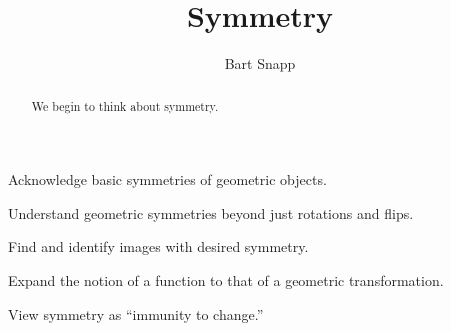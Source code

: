 \documentclass[noauthor,nooutcomes,12pt,handout]{ximera}
\title{Symmetry}
\author{Bart Snapp}
\begin{document}
\begin{abstract}
  We begin to think about symmetry.
\end{abstract}
\maketitle

\begin{listOutcomes}
\item Acknowledge basic symmetries of geometric objects.
\item Understand geometric symmetries beyond just rotations and flips.
\item Find and identify images with desired symmetry.
\item Expand the notion of a function to that of a geometric
  transformation.
\item View symmetry as ``immunity to change.''
\end{listOutcomes}
\mynewpage
\end{document}

